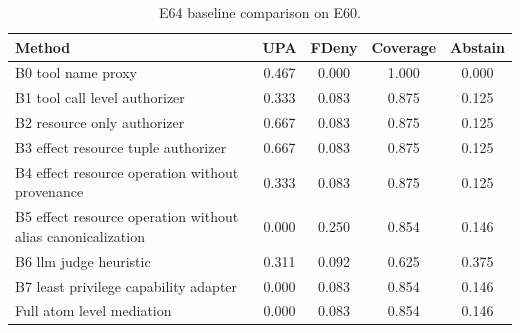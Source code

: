 \begin{table}[t]
\centering
\small
\caption{E64 baseline comparison on E60.}
\label{tab:baselines-e60}
\begin{tabular}{lcccc}
\toprule
Method & UPA & FDeny & Coverage & Abstain \\
\midrule
B0 tool name proxy & 0.467 & 0.000 & 1.000 & 0.000 \\
B1 tool call level authorizer & 0.333 & 0.083 & 0.875 & 0.125 \\
B2 resource only authorizer & 0.667 & 0.083 & 0.875 & 0.125 \\
B3 effect resource tuple authorizer & 0.667 & 0.083 & 0.875 & 0.125 \\
B4 effect resource operation without provenance & 0.333 & 0.083 & 0.875 & 0.125 \\
B5 effect resource operation without alias canonicalization & 0.000 & 0.250 & 0.854 & 0.146 \\
B6 llm judge heuristic & 0.311 & 0.092 & 0.625 & 0.375 \\
B7 least privilege capability adapter & 0.000 & 0.083 & 0.854 & 0.146 \\
Full atom level mediation & 0.000 & 0.083 & 0.854 & 0.146 \\
\bottomrule
\end{tabular}
\end{table}
